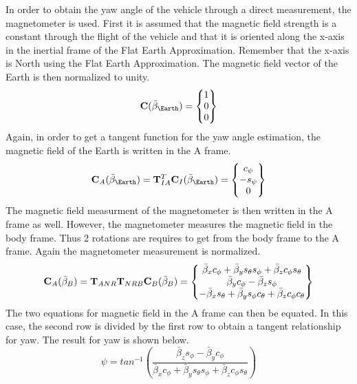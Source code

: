 \documentclass{article}
\begin{document}
In order to obtain the yaw angle of the vehicle through a direct measurement, the magnetometer is used. First it is assumed that the magnetic field strength is a constant through the flight of the vehicle and that it is oriented along the x-axis in the inertial frame of the Flat Earth Approximation. Remember that the x-axis is North using the Flat Earth Approximation. The magnetic field vector of the Earth is then normalized to unity. 
\begin{equation}
{\bf C}(\bar{\beta}_{\Earth}) = \begin{Bmatrix} 1 \\ 0 \\ 0 \end{Bmatrix}
\end{equation}
Again, in order to get a tangent function for the yaw angle estimation, the magnetic field of the Earth is written in the A frame. 
\begin{equation}
{\bf C}_A(\bar{\beta}_{\Earth}) = {\bf T}_{IA}^T{\bf C}_I(\bar{\beta}_{\Earth}) = \begin{Bmatrix} c_{\psi} \\ -s_{\psi} \\ 0 \end{Bmatrix}
\end{equation}
The magnetic field measurment of the magnetometer is then written in the A frame as well. However, the magnetometer measures the magnetic field in the body frame. Thus 2 rotations are requires to get from the body frame to the A frame. Again the magnetometer measurement is normalized.
\begin{equation}
{\bf C}_A(\bar{\beta}_{B}) = {\bf T}_{ANR}{\bf T}_{NRB}{\bf C}_B(\bar{\beta}_B)=\begin{Bmatrix} \bar{\beta}_x c_{\phi} + \bar{\beta}_y s_{\theta}s_{\phi} + \bar{\beta}_z c_{\phi}s_{\theta} \\ \bar{\beta}_y c_{\phi} - \bar{\beta}_z s_{\phi} \\ -\bar{\beta}_x s_{\theta} + \bar{\beta}_y s_{\phi}c_{\theta} + \bar{\beta}_z c_{\phi} c_{\theta} \end{Bmatrix}
\end{equation}
The two equations for magnetic field in the A frame can then be equated. In this case, the second row is divided by the first row to obtain a tangent relationship for yaw. The result for yaw is shown below.
\begin{equation}
\psi = tan^{-1}\left(\frac{\bar{\beta}_z s_{\phi} - \bar{\beta}_y c_{\phi}}{\bar{\beta}_x c_{\phi} + \bar{\beta}_y s_{\theta}s_{\phi} + \bar{\beta}_z c_{\phi}s_{\theta}}\right)
\end{equation}
\end{document}
